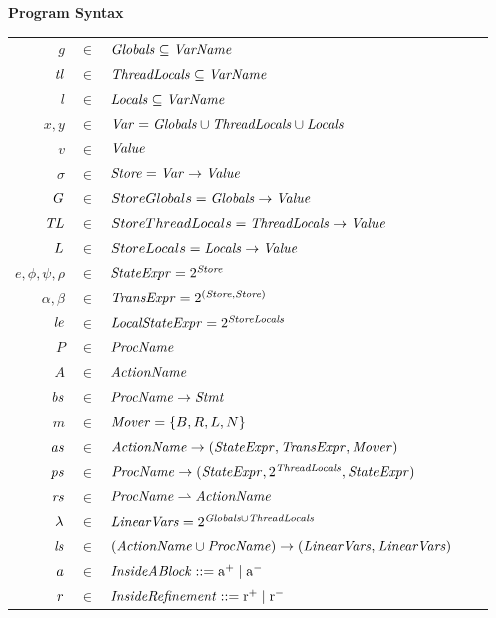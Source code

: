 \begin{figure}
\setlength{\tabcolsep}{3pt}
{\bf Program Syntax} \\
\begin{tabular}{rclcl}
$g$ & $\in$ & $\mathit{Globals} \subseteq \mathit{VarName}$ \\
$\mathit{tl}$ & $\in$ & $\mathit{ThreadLocals} \subseteq \mathit{VarName}$ \\
$l$ & $\in$ & $\mathit{Locals} \subseteq \mathit{VarName}$ \\
$x,y$ & $\in$ & $\mathit{Var} = \mathit{Globals} \cup \mathit{ThreadLocals} \cup \mathit{Locals}$ \\
$v$ &  $\in$ & $\mathit{Value}$ \\
$\sigma$ & $\in$ & $\mathit{Store} = \mathit{Var} \rightarrow \mathit{Value}$ \\
$G$ & $\in$ & $StoreGlobals = \mathit{Globals} \rightarrow \mathit{Value}$ \\
$\mathit{TL}$ & $\in$ & $StoreThreadLocals = \mathit{ThreadLocals}  \rightarrow \mathit{Value}$ \\
$L$ & $\in$ & $StoreLocals = \mathit{Locals} \rightarrow \mathit{Value}$ \\
$e, \phi, \psi, \rho$ & $\in$ & $\mathit{StateExpr} = 2^{\mathit{Store}}$ \\
$\alpha, \beta$ & $\in$ & $\mathit{TransExpr} = 2^{(\mathit{Store},\mathit{Store})}$ \\
$\mathit{le}$ & $\in$ & $\mathit{LocalStateExpr} = 2^{\mathit{StoreLocals}}$ \\
$P$ & $\in$ & $\mathit{ProcName}$ \\
$A$ & $\in$ & $\mathit{ActionName}$ \\
$\mathit{bs}$ & $\in$ & $\mathit{ProcName} \rightarrow \mathit{Stmt}$ \\
$m$ & $\in$ & $\mathit{Mover} = \{B,R,L,N\}$\\
$\mathit{as}$ & $\in$ & $\mathit{ActionName} \rightarrow (\mathit{StateExpr}, \mathit{TransExpr}, \mathit{Mover})$ \\
$\mathit{ps}$ & $\in$ & $\mathit{ProcName} \rightarrow (\mathit{StateExpr}, 2^{\mathit{ThreadLocals}}, \mathit{StateExpr})$ \\
$\mathit{rs}$ & $\in$ & $\mathit{ProcName} \rightharpoonup \mathit{ActionName}$ \\
$\lambda$ & $\in$ & $\mathit{LinearVars} = 2^{\mathit{Globals} \cup \mathit{ThreadLocals}}$ \\
$\mathit{ls}$ & $\in$ & $(\mathit{ActionName} \cup \mathit{ProcName}) \rightarrow (\mathit{LinearVars}, \mathit{LinearVars})$ \\
$a$ & $\in$ & $\mathit{InsideABlock} ::= \mathrm{a^+} \mid \mathrm{a^-}$ \\
$r$ & $\in$ & $\mathit{InsideRefinement} ::= \mathrm{r^+} \mid \mathrm{r^-}$ \\
\end{tabular}

\end{figure}
